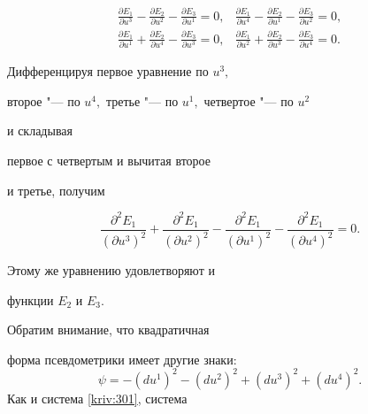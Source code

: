\begin{equation}

\begin{array}{ll}

\displaystyle 

\frac{\partial E_{1}}{\partial u^{3}}-\frac{\partial E_{2}}{\partial u^{2}}-\frac{\partial E_{3}}{\partial u^{1}}=0,

& 

\displaystyle 

\frac{\partial E_{1}}{\partial u^{4}}-\frac{\partial E_{2}}{\partial u^{1}}-\frac{\partial E_{3}}{\partial u^{2}}=0, \\[3mm] 

\displaystyle 

\frac{\partial E_{1}}{\partial u^{1}}+\frac{\partial E_{2}}{\partial u^{4}}-\frac{\partial E_{3}}{\partial u^{3}}=0, & 

\displaystyle 

\frac{\partial E_{1}}{\partial u^{2}}+\frac{\partial E_{2}}{\partial u^{3}}-\frac{\partial E_{3}}{\partial u^{4}}=0.\end{array}

\label{kriv:310}

\end{equation}

Дифференцируя первое уравнение по $u^{3},$ 

второе "--- по $u^{4},$ третье "--- по $u^{1},$ четвертое "--- по $u^{2}$ 

и складывая 

первое с четвертым и вычитая второе 

и третье, получим

\begin{equation*}

\frac{\partial ^{2}E_{1}}{\left( \partial u^{3}\right) ^{2}}+\frac{\partial

^{2}E_{1}}{\left( \partial u^{2}\right) ^{2}}-\frac{\partial ^{2}E_{1}}{\left( \partial u^{1}\right) ^{2}}-\frac{\partial ^{2}E_{1}}{\left( \partial

u^{4}\right) ^{2}}=0.

\end{equation*}

Этому же уравнению удовлетворяют и 

функции $E_{2}$ и $E_{3}.$ 

Обратим внимание, что квадратичная 

форма псевдометрики имеет другие знаки:\begin{equation}

\psi =-\left( du^{1}\right) ^{2}-\left( du^{2}\right) ^{2}+\left(

du^{3}\right) ^{2}+\left( du^{4}\right) ^{2}.  \label{kriv:312}

\end{equation}Как и система \eqref{kriv:301}, система 

